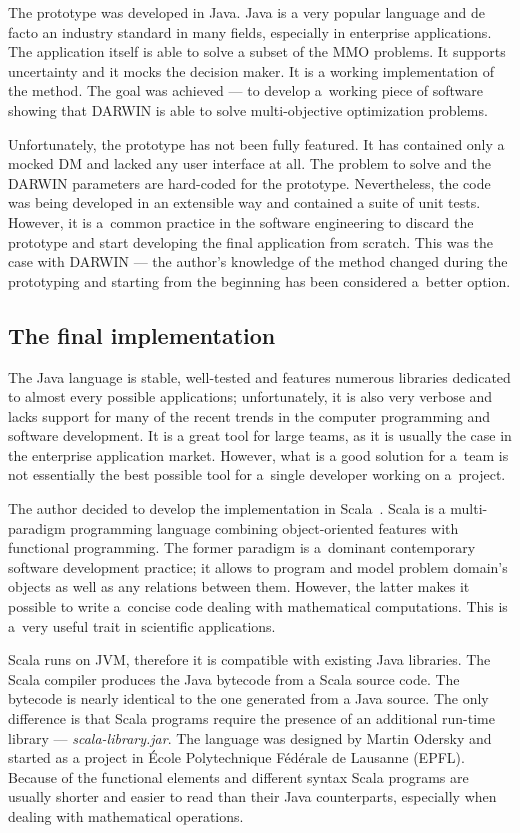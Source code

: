 The prototype was developed in Java. Java is a very popular language and de
facto an industry standard in many fields, especially in enterprise
applications. The application itself is able to solve a subset of the MMO
problems. It supports uncertainty and it mocks the decision maker. It is a
working implementation of the method. The goal was achieved --- to develop
a~working piece of software showing that DARWIN is able to solve
multi-objective optimization problems. 

Unfortunately, the prototype has not been fully featured. It has contained
only a mocked DM and lacked any user interface at all. The problem to solve
and the DARWIN parameters are hard-coded for the prototype. Nevertheless, the
code was being developed in an extensible way and contained a suite of unit
tests. However, it is a~common practice in the software engineering to discard
the prototype and start developing the final application from scratch.  This
was the case with DARWIN --- the author's knowledge of the method changed
during the prototyping and starting from the beginning has been considered
a~better option.

\subsection{The final implementation}
The Java language is stable, well-tested and features numerous libraries
dedicated to almost every possible applications; unfortunately, it is also
very verbose and lacks support for many of the recent trends in the computer
programming and software development. It is a great tool for large teams, as
it is usually the case in the enterprise application market. However, what is
a good solution for a~team is not essentially the best possible tool for
a~single developer working on a~project.

The author decided to develop the implementation in Scala~\cite{Sca}. Scala is
a multi-paradigm programming language combining object-oriented features with
functional programming. The former paradigm is a~dominant contemporary
software development practice; it allows to program and model problem domain's
objects as well as any relations between them. However, the latter makes it
possible to write a~concise code dealing with mathematical computations. This
is a~very useful trait in scientific applications.

Scala runs on JVM, therefore it is compatible with existing Java
libraries. The Scala compiler produces the Java bytecode from a Scala source
code. The bytecode is nearly identical to the one generated from a Java
source. The only difference is that Scala programs require the presence of an
additional run-time library --- \textit{scala-library.jar}. The language was
designed by Martin Odersky and started as a project in École Polytechnique
Fédérale de Lausanne (EPFL). Because of the functional elements and different
syntax Scala programs are usually shorter and easier to read than their Java
counterparts, especially when dealing with mathematical operations.

